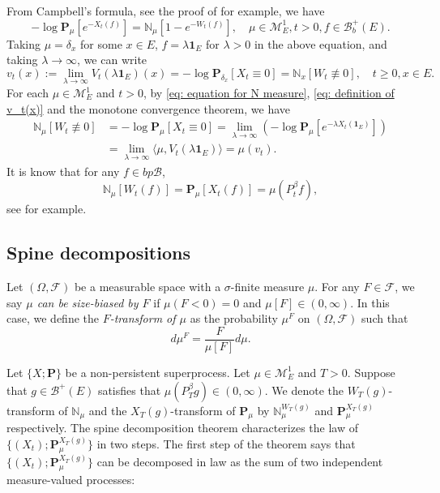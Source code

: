 \documentclass[12pt, a4paper]{amsart}
\theoremstyle{definition}
\numberwithin{equation}{section}
\begin{document}
	From  Campbell's formula, see  the proof of \cite[Theorem 2.7]{Kyprianou2014Fluctuations} for example, we have
\[ \label{eq: equation for N measure}
	- \log \mathbf P_\mu [e^{-X_t(f)}]
	= \mathbb N_\mu[ 1-e^{- W_t(f)}],
	\quad \mu \in \mathcal M_E^1, t>0, 
	f\in \mathscr B_b^+(E).
\]
	Taking $\mu = \delta_x$ for some $x\in E$, $f = \lambda \mathbf 1_E$ for $\lambda > 0$ in the above equation, and taking $\lambda \to \infty$, we can write
\[ \label{eq: definition of v_t(x)}
	v_t(x)
	:= \lim_{\lambda\to \infty} V_t(\lambda\mathbf 1_E)(x)
	= -\log \mathbf P_{\delta_x} [X_t \equiv 0]
	= \mathbb N_x[W_t\not \equiv 0],
	\quad t\geq 0, x\in E.
\]
	For each $\mu \in \mathcal M_E^1$ and $t > 0$, by \eqref{eq: equation for N measure}, \eqref{eq: definition of v_t(x)} and the monotone convergence theorem, we have
\[ \label{eq: equation for mu v-t}\begin{split}
    \mathbb N_\mu[W_t\not \equiv 0]
	&= -\log \mathbf P_{\mu} [X_t \equiv 0]
	= \lim_{\lambda \to \infty} (- \log \mathbf P_\mu [e^{-\lambda X_t(\mathbf 1_E)}])
	\\&= \lim_{\lambda \to \infty} \langle \mu, V_t(\lambda \mathbf 1_E)\rangle
	= \mu(v_t).
\end{split}\]
    It is know that for any $f\in bp{\mathscr B}$,
\[\label{eq: mean of kuz measure}
    \mathbb N_{\mu}[W_t(f)]
    =\mathbf P_{\mu}[X_t(f)]=\mu(P^\beta_tf),
\]
    see \cite[Lemma 3.3]{RenSongSun2017Spine} for example. 

\subsection{Spine decompositions}
\label{sec: Spine decompositions}
	Let $(\Omega, \mathscr F)$ be a measurable space with a $\sigma$-finite measure $\mu$.
	For any $F\in \mathscr F$, we say \emph{$\mu$ can be size-biased by $F$} if $\mu(F< 0) = 0$ and 
	$\mu [F] \in (0,\infty)$.
	In this case, we define the \emph{$F$-transform of $\mu$} as the probability $\mu^F$ on $(\Omega, \mathscr F)$ such that
	$$d\mu^F= \frac{F}{\mu[F]}d \mu.$$

	Let $\{X;\mathbf P\}$ be a non-persistent superprocess.
	Let $\mu \in \mathcal M^1_E$ and $T>0$.
	Suppose that $g\in \mathscr B^+(E)$ satisfies that $\mu(P^\beta_Tg) \in (0,\infty)$.
	We denote  the $W_T(g)$-transform of $\mathbb N_\mu$ and the $X_T(g)$-transform of $\mathbf P_\mu$ 
	by $\mathbb N^{W_T(g)}_\mu$ and $\mathbf P_\mu^{X_T(g)}$ respectively.
	The  spine decomposition theorem characterizes the law of $\{(X_t); \mathbf P_\mu^{X_T(g)}\}$ in two steps.
	The first step of the theorem says that $\{(X_t); \mathbf P_\mu^{X_T(g)}\}$ can be decomposed in law as the sum of two independent measure-valued processes:
	
\end{document}
